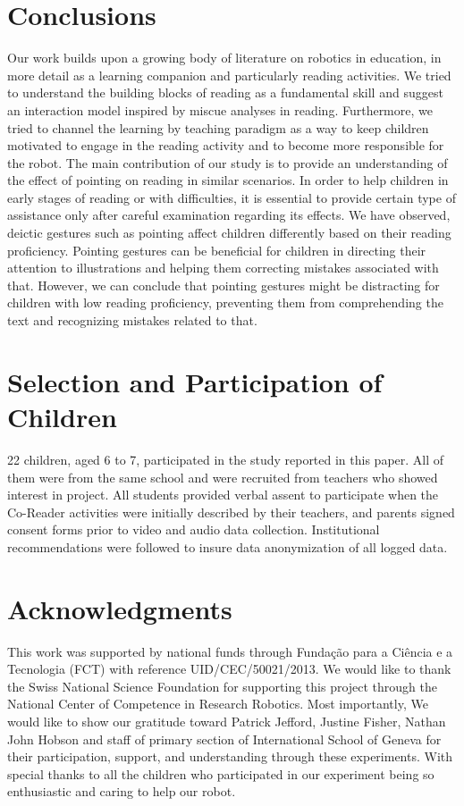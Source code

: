 \documentclass{sigchi}
\begin{document}
\section{Conclusions}
Our work builds upon a growing body of literature on robotics in education, in more detail as a learning companion and particularly reading activities. 
We tried to understand the building blocks of reading as a fundamental skill and suggest an interaction model inspired by miscue analyses in reading. 
Furthermore, we tried to channel the learning by teaching paradigm as a way to keep children motivated to engage in the reading activity and to become more responsible for the robot. 
The main contribution of our study is to provide an understanding of the effect of pointing on reading in similar scenarios.
In order to help children in early stages of reading or with difficulties, it is essential to provide certain type of assistance only after careful examination regarding its effects.
We have observed, deictic gestures such as pointing affect children differently based on their reading proficiency. 
Pointing gestures can be beneficial for children in directing their attention to illustrations and helping them correcting mistakes associated with that.
However, we can conclude that pointing gestures might be distracting for children with low reading proficiency, preventing them from comprehending the text and recognizing mistakes related to that.

\section{Selection and Participation of Children}
22  children,  aged  6  to  7,  participated  in  the  study  reported in  this  paper.  All  of  them  were  from  the same school and 
were  recruited  from teachers who showed interest in project. 
All  students  provided  verbal  assent  to  participate when  the  Co-Reader  activities  were  initially  described  by their teachers,  and  parents  signed  consent  forms  prior  to video  and  audio  data  collection. 
Institutional recommendations were followed to insure data anonymization of all logged data.


\section{Acknowledgments}
This work was supported by national funds through Fundação para a Ciência e a Tecnologia (FCT) with reference UID/CEC/50021/2013. 
We would like to thank the Swiss National Science Foundation for supporting this project through the National Center of Competence in Research Robotics. 
Most importantly, We would like to show our gratitude toward Patrick Jefford, Justine Fisher, Nathan John Hobson and staff of primary section of International School of Geneva for their participation, support, and understanding through these experiments. With special thanks to all the children who participated in our experiment being so enthusiastic and caring to help our robot.   
\end{document}
